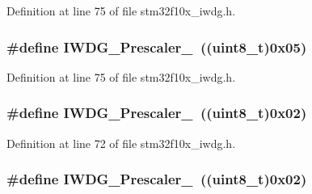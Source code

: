 Definition at line 75 of file stm32f10x\+\_\+iwdg.\+h.

\subsubsection[{\texorpdfstring{I\+W\+D\+G\+\_\+\+Prescaler\+\_\+128}{IWDG_Prescaler_128}}]{\setlength{\rightskip}{0pt plus 5cm}\#define I\+W\+D\+G\+\_\+\+Prescaler\+\_~(({\bf uint8\+\_\+t})0x05)}\hypertarget{group___i_w_d_g__prescaler_gaea6bf96c2fd5a6f3b9574e7898096641}{}\label{group___i_w_d_g__prescaler_gaea6bf96c2fd5a6f3b9574e7898096641}


Definition at line 75 of file stm32f10x\+\_\+iwdg.\+h.

\subsubsection[{\texorpdfstring{I\+W\+D\+G\+\_\+\+Prescaler\+\_\+16}{IWDG_Prescaler_16}}]{\setlength{\rightskip}{0pt plus 5cm}\#define I\+W\+D\+G\+\_\+\+Prescaler\+\_~(({\bf uint8\+\_\+t})0x02)}\hypertarget{group___i_w_d_g__prescaler_gafa81d30511ff5ec74bb38ed71f5bb66e}{}\label{group___i_w_d_g__prescaler_gafa81d30511ff5ec74bb38ed71f5bb66e}


Definition at line 72 of file stm32f10x\+\_\+iwdg.\+h.

\subsubsection[{\texorpdfstring{I\+W\+D\+G\+\_\+\+Prescaler\+\_\+16}{IWDG_Prescaler_16}}]{\setlength{\rightskip}{0pt plus 5cm}\#define I\+W\+D\+G\+\_\+\+Prescaler\+\_~(({\bf uint8\+\_\+t})0x02)}\hypertarget{group___i_w_d_g__prescaler_gafa81d30511ff5ec74bb38ed71f5bb66e}{}\label{group___i_w_d_g__prescaler_gafa81d30511ff5ec74bb38ed71f5bb66e}


